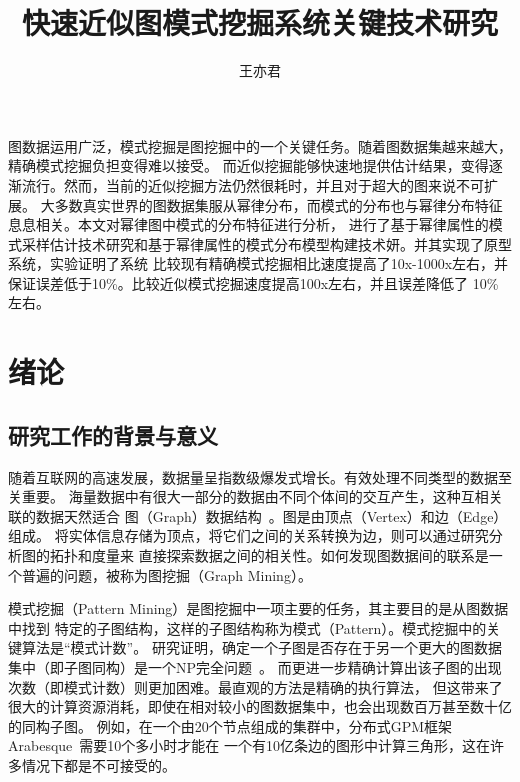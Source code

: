 \documentclass[master]{thesis-uestc}
\title{快速近似图模式挖掘系统关键技术研究}{A Research of technologies of 
fast approximate graph pattern mining system}
\author{王亦君}{Yijun Wang}
\begin{document}
\makecover

\begin{chineseabstract}
    
    图数据运用广泛，模式挖掘是图挖掘中的一个关键任务。随着图数据集越来越大，精确模式挖掘负担变得难以接受。
而近似挖掘能够快速地提供估计结果，变得逐渐流行。然而，当前的近似挖掘方法仍然很耗时，并且对于超大的图来说不可扩展。
大多数真实世界的图数据集服从幂律分布，而模式的分布也与幂律分布特征息息相关。本文对幂律图中模式的分布特征进行分析，
进行了基于幂律属性的模式采样估计技术研究和基于幂律属性的模式分布模型构建技术妍。并其实现了原型系统，实验证明了系统
比较现有精确模式挖掘相比速度提高了10x-1000x左右，并保证误差低于10\%。比较近似模式挖掘速度提高100x左右，并且误差降低了
10\%左右。


\end{chineseabstract}

\begin{englishabstract}

\end{englishabstract}

\thesistableofcontents

\chapter{绪\hspace{6pt}论}

\section{研究工作的背景与意义}

    随着互联网的高速发展，数据量呈指数级爆发式增长。有效处理不同类型的数据至关重要。
海量数据中有很大一部分的数据由不同个体间的交互产生，这种互相关联的数据天然适合
图（Graph）数据结构~\cite{NetworkScience}。图是由顶点（Vertex）和边（Edge）组成。
将实体信息存储为顶点，将它们之间的关系转换为边，则可以通过研究分析图的拓扑和度量来
直接探索数据之间的相关性。如何发现图数据间的联系是一个普遍的问题，被称为图挖掘（Graph Mining）。

    模式挖掘（Pattern Mining）是图挖掘中一项主要的任务，其主要目的是从图数据中找到
特定的子图结构，这样的子图结构称为模式（Pattern）。模式挖掘中的关键算法是“模式计数”。
研究证明，确定一个子图是否存在于另一个更大的图数据集中（即子图同构）是一个NP完全问题~\cite{Complexity}。
而更进一步精确计算出该子图的出现次数（即模式计数）则更加困难。最直观的方法是精确的执行算法，
但这带来了很大的计算资源消耗，即使在相对较小的图数据集中，也会出现数百万甚至数十亿的同构子图。
例如，在一个由20个节点组成的集群中，分布式GPM框架Arabesque~\cite{Arabesque}需要10个多小时才能在
一个有10亿条边的图形中计算三角形，这在许多情况下都是不可接受的。
\end{document}
